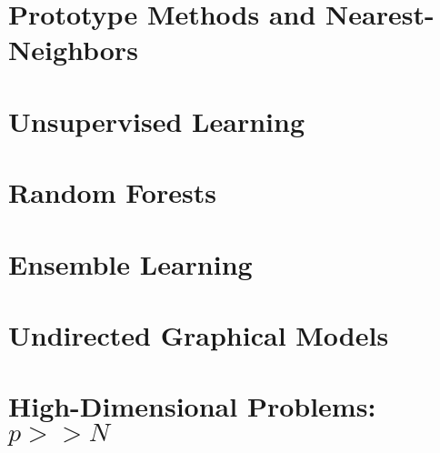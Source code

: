 \documentclass[a4paper,12pt,titlepage]{article} %
\begin{document}
\section{Prototype Methods and Nearest-Neighbors}


\newpage
\section{Unsupervised Learning}


\newpage
\section{Random Forests}


\newpage
\section{Ensemble Learning}


\newpage
\section{Undirected Graphical Models}


\newpage
\section{High-Dimensional Problems: $ p >> N $}


\newpage
\listoftables

\newpage
\listoffigures

\end{document}
